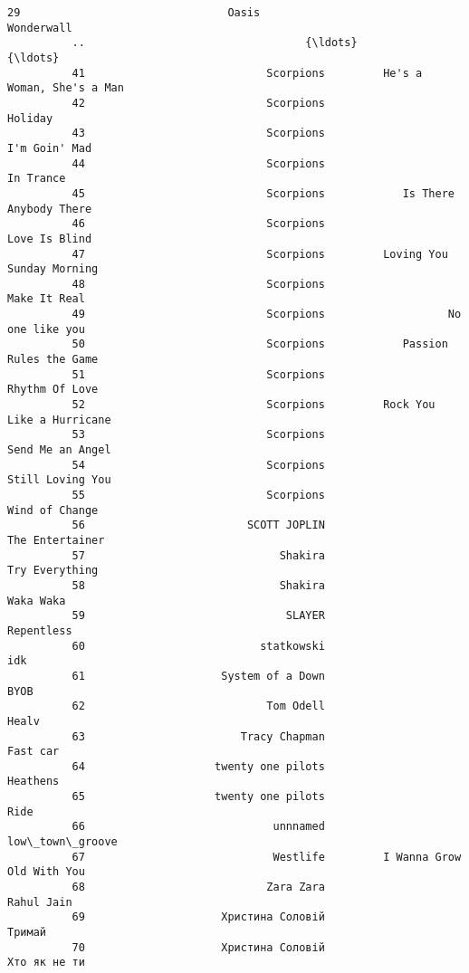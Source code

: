\documentclass[11pt]{article}
\begin{document}
\begin{Verbatim}[commandchars=\\\{\}]
          29                                Oasis                        Wonderwall    
          ..                                  {\ldots}                                {\ldots}   
          41                            Scorpions         He's a Woman, She's a Man    
          42                            Scorpions                           Holiday    
          43                            Scorpions                     I'm Goin' Mad    
          44                            Scorpions                         In Trance    
          45                            Scorpions            Is There Anybody There    
          46                            Scorpions                     Love Is Blind    
          47                            Scorpions         Loving You Sunday Morning    
          48                            Scorpions                      Make It Real    
          49                            Scorpions                   No one like you    
          50                            Scorpions            Passion Rules the Game    
          51                            Scorpions                    Rhythm Of Love    
          52                            Scorpions         Rock You Like a Hurricane    
          53                            Scorpions                  Send Me an Angel    
          54                            Scorpions                  Still Loving You    
          55                            Scorpions                    Wind of Change    
          56                         SCOTT JOPLIN                   The Entertainer    
          57                              Shakira                     Try Everything   
          58                              Shakira                         Waka Waka    
          59                               SLAYER                        Repentless    
          60                           statkowski                               idk    
          61                     System of a Down                             BYOB     
          62                            Tom Odell                             Healv    
          63                        Tracy Chapman                         Fast car     
          64                    twenty one pilots                         Heathens     
          65                    twenty one pilots                              Ride    
          66                             unnnamed                   low\_town\_groove    
          67                             Westlife         I Wanna Grow Old With You    
          68                            Zara Zara                        Rahul Jain    
          69                     Христина Соловій                            Тримай    
          70                     Христина Соловій                     Хто як не ти     
          

\end{Verbatim}
\end{document}
